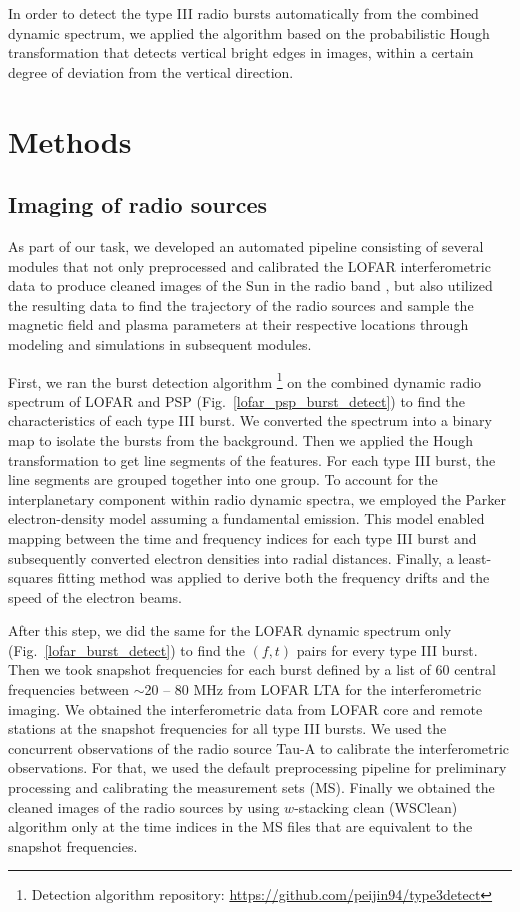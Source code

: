 In order to detect the type III radio bursts automatically from the combined dynamic spectrum, we applied the \citet{zhang18} algorithm  based on the probabilistic Hough transformation that detects vertical bright edges in images, within a certain degree of deviation from the vertical direction.

\section{Methods}
\label{sec_ch3_methods}
\subsection{Imaging of radio sources}
As part of our task, we developed an automated pipeline consisting of several modules that not only preprocessed and calibrated the LOFAR interferometric data to produce cleaned images of the Sun in the radio band \citep{zhang_2022}, but also utilized the resulting data to find the trajectory of the radio sources and sample the magnetic field and plasma parameters at their respective locations through modeling and simulations in subsequent modules.

First, we ran the burst detection algorithm \citep{zhang_2018} \footnote{Detection algorithm repository: \url{https://github.com/peijin94/type3detect}} on the combined dynamic radio spectrum of LOFAR and PSP (Fig.~\ref{lofar_psp_burst_detect}) to find the characteristics of each type III burst. We converted the spectrum into a binary map to isolate the bursts from the background. Then we applied the Hough transformation to get line segments of the features. For each type III burst, the line segments are grouped together into one group. To account for the interplanetary component within radio dynamic spectra, we employed the Parker electron-density model \citep{parker_1960} assuming a fundamental emission. This model enabled mapping between the time and frequency indices for each type III burst and subsequently converted electron densities into radial distances. Finally, a least-squares fitting method was applied to derive both the frequency drifts and the speed of the electron beams.

After this step, we did the same for the LOFAR dynamic spectrum only (Fig.~\ref{lofar_burst_detect}) to find the $(f,t)$ pairs for every type III burst. Then we took snapshot frequencies for each burst defined by a list of 60 central frequencies between $\sim$20 -- 80 MHz from LOFAR LTA for the interferometric imaging. We obtained the interferometric data from LOFAR core and remote stations at the snapshot frequencies for all type III bursts. We used the concurrent observations of the radio source Tau-A  to calibrate the interferometric observations. For that, we used the default preprocessing pipeline \citep[DP3]{dppp18} for preliminary processing and calibrating the measurement sets (MS). Finally we obtained the cleaned images of the radio sources by using $w$-stacking clean (WSClean) algorithm \citep{wsclean14} only at  the time indices in the MS files that are equivalent to the snapshot frequencies.

